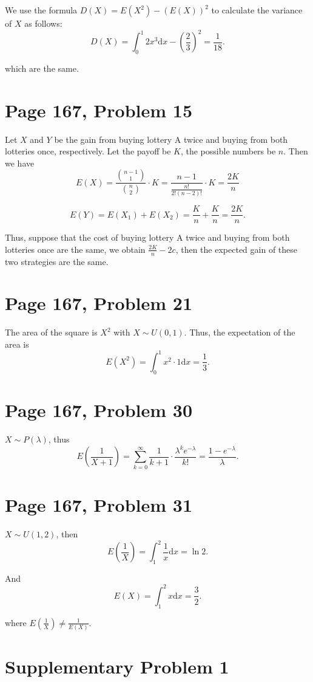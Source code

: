 \documentclass[a4paper, UTF-8]{article}
\theoremstyle{plain}
\begin{document}
We use the formula $D(X) = E(X^2) - (E(X))^2$ to calculate the variance of $X$ as follows:
$$
D(X) = \int_{0}^1 2x^3 \mathrm{d}x - (\frac{2}{3})^2 = \frac{1}{18}.
$$

which are the same.

\section{Page 167, Problem 15}

Let $X$ and $Y$ be the gain from buying lottery A twice and buying from both lotteries once, respectively. Let the payoff be $K$, the possible numbers be $n$. Then we have
$$
E(X) = \frac{\binom{n-1}{1}}{\binom{n}{2}} \cdot K = \frac{n - 1}{\frac{n!}{2!(n - 2)!}} \cdot K = \frac{2K}{n}
$$

$$
E(Y) = E(X_1) + E(X_2) = \frac{K}{n} + \frac{K}{n} = \frac{2K}{n}. 
$$

Thus, suppose that the cost of buying lottery A twice and buying from both lotteries once are the same, we obtain $\frac{2K}{n} - 2c$, then the expected gain of these two strategies are the same.

\section{Page 167, Problem 21}

The area of the square is $X^2$ with $X \sim U(0, 1)$. Thus, the expectation of the area is
$$
E(X^2) = \int_{0}^1 x^2 \cdot 1 \mathrm{d}x = \frac{1}{3}.
$$

\section{Page 167, Problem 30}

$X \sim P(\lambda)$, thus 
$$
E(\frac{1}{X + 1}) = \sum_{k=0}^\infty \frac{1}{k+1} \cdot \frac{\lambda^k e^{-\lambda}}{k!} = \frac{1 - e^{-\lambda}}{\lambda}.
$$

\section{Page 167, Problem 31}

$X \sim U(1,2)$, then 
$$
E(\frac{1}{X}) = \int_{1}^2 \frac{1}{x} \mathrm{d}x = \ln 2.
$$

And 
$$
E(X) = \int_{1}^2 x \mathrm{d}x = \frac{3}{2}.
$$

where $E(\frac{1}{X}) \ne \frac{1}{E(X)}$.

\section{Supplementary Problem 1}
\end{document}
